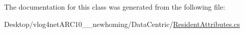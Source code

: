 The documentation for this class was generated from the following file\-:\begin{DoxyCompactItemize}
\item 
Desktop/vlog4net\-A\-R\-C10\-\_\-\_\-newhoming/\-Data\-Centric/\hyperlink{_resident_attributes_8cs}{Resident\-Attributes.\-cs}\end{DoxyCompactItemize}
